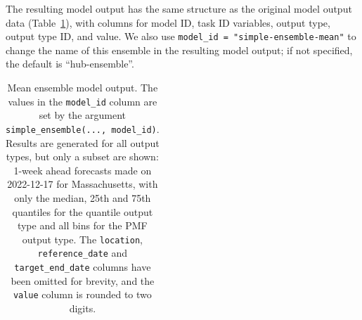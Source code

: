 \documentclass[
  letterpaper,
  DIV=11,
  numbers=noendperiod]{scrartcl}
\begin{document}
The resulting model output has the same structure as the original model
output data (Table~\ref{tbl-mean-ensemble}), with columns for model ID,
task ID variables, output type, output type ID, and value. We also use
\texttt{model\_id\ =\ "simple-ensemble-mean"} to change the name of this
ensemble in the resulting model output; if not specified, the default is
``hub-ensemble''.

\begin{longtable}[]{@{}
  >{\raggedright\arraybackslash}p{}
  >{\raggedright\arraybackslash}p{}
  >{\raggedleft\arraybackslash}p{}
  >{\raggedright\arraybackslash}p{}
  >{\raggedright\arraybackslash}p{}
  >{\raggedleft\arraybackslash}p{}@{}}

\caption{\label{tbl-mean-ensemble}Mean ensemble model output. The values
in the \texttt{model\_id} column are set by the argument
\texttt{simple\_ensemble(...,\ model\_id)}. Results are generated for
all output types, but only a subset are shown: 1-week ahead forecasts
made on 2022-12-17 for Massachusetts, with only the median, 25th and
75th quantiles for the quantile output type and all bins for the PMF
output type. The \texttt{location}, \texttt{reference\_date} and
\texttt{target\_end\_date} columns have been omitted for brevity, and
the \texttt{value} column is rounded to two digits.}

\tabularnewline


\end{longtable}
\end{document}
